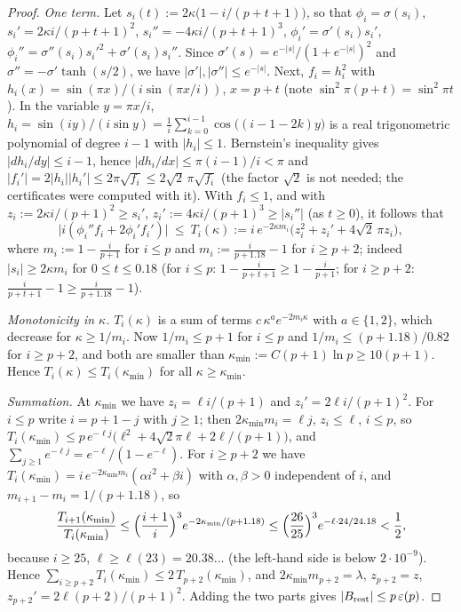 \begin{proof}
\emph{One term.} Let $s_i(t):=2\kappa\bigl(1-i/(p+t+1)\bigr)$, so that $\phi_i=\sigma(s_i)$, $s_i'=2\kappa i/(p+t+1)^2$, $s_i''=-4\kappa i/(p+t+1)^3$, $\phi_i'=\sigma'(s_i)s_i'$, $\phi_i''=\sigma''(s_i)s_i'^2+\sigma'(s_i)s_i''$. Since $\sigma'(s)=e^{-|s|}/(1+e^{-|s|})^2$ and $\sigma''=-\sigma'\tanh(s/2)$, we have $|\sigma'|,|\sigma''|\le e^{-|s|}$. Next, $f_i=h_i^2$ with $h_i(x)=\sin(\pi x)/(i\sin(\pi x/i))$, $x=p+t$ (note $\sin^2\pi(p+t)=\sin^2\pi t$). In the variable $y=\pi x/i$, $h_i=\sin(iy)/(i\sin y)=\tfrac1i\sum_{k=0}^{i-1}\cos\bigl((i-1-2k)y\bigr)$ is a real trigonometric polynomial of degree $i-1$ with $|h_i|\le1$. Bernstein's inequality gives $|dh_i/dy|\le i-1$, hence $|dh_i/dx|\le\pi(i-1)/i<\pi$ and $|f_i'|=2|h_i||h_i'|\le2\pi\sqrt{f_i}\le2\sqrt2\,\pi\sqrt{f_i}$ (the factor $\sqrt2$ is not needed; the certificates were computed with it). With $f_i\le1$, and with $z_i:=2\kappa i/(p+1)^2\ge s_i'$, $z_i':=4\kappa i/(p+1)^3\ge|s_i''|$ (as $t\ge0$), it follows that
\[
\bigl|i(\phi_i''f_i+2\phi_i'f_i')\bigr|\ \le\ T_i(\kappa):=i\,e^{-2\kappa m_i}\bigl(z_i^2+z_i'+4\sqrt2\,\pi z_i\bigr),
\]
where $m_i:=1-\tfrac i{p+1}$ for $i\le p$ and $m_i:=\tfrac i{p+1.18}-1$ for $i\ge p+2$; indeed $|s_i|\ge2\kappa m_i$ for $0\le t\le0.18$ (for $i\le p$: $1-\tfrac i{p+t+1}\ge1-\tfrac i{p+1}$; for $i\ge p+2$: $\tfrac i{p+t+1}-1\ge\tfrac i{p+1.18}-1$).

\emph{Monotonicity in $\kappa$.} $T_i(\kappa)$ is a sum of terms $c\,\kappa^ae^{-2m_i\kappa}$ with $a\in\{1,2\}$, which decrease for $\kappa\ge1/m_i$. Now $1/m_i\le p+1$ for $i\le p$ and $1/m_i\le(p+1.18)/0.82$ for $i\ge p+2$, and both are smaller than $\kappa_{\min}:=C(p+1)\ln p\ge10(p+1)$. Hence $T_i(\kappa)\le T_i(\kappa_{\min})$ for all $\kappa\ge\kappa_{\min}$.

\emph{Summation.} At $\kappa_{\min}$ we have $z_i=\ell i/(p+1)$ and $z_i'=2\ell i/(p+1)^2$. For $i\le p$ write $i=p+1-j$ with $j\ge1$; then $2\kappa_{\min}m_i=\ell j$, $z_i\le\ell$, $i\le p$, so $T_i(\kappa_{\min})\le p\,e^{-\ell j}\bigl(\ell^2+4\sqrt2\pi\ell+2\ell/(p+1)\bigr)$, and $\sum_{j\ge1}e^{-\ell j}=e^{-\ell}/(1-e^{-\ell})$. For $i\ge p+2$ we have $T_i(\kappa_{\min})=i\,e^{-2\kappa_{\min}m_i}(\alpha i^2+\beta i)$ with $\alpha,\beta>0$ independent of $i$, and $m_{i+1}-m_i=1/(p+1.18)$, so
\[
\frac{T_{i+1}(\kappa_{\min})}{T_i(\kappa_{\min})}\le\Bigl(\frac{i+1}i\Bigr)^3e^{-2\kappa_{\min}/(p+1.18)}\le\Bigl(\frac{26}{25}\Bigr)^3e^{-\ell\cdot24/24.18}<\frac12,
\]
because $i\ge25$, $\ell\ge\ell(23)=20.38\ldots$ (the left-hand side is below $2\cdot10^{-9}$). Hence $\sum_{i\ge p+2}T_i(\kappa_{\min})\le2\,T_{p+2}(\kappa_{\min})$, and $2\kappa_{\min}m_{p+2}=\lambda$, $z_{p+2}=z$, $z_{p+2}'=2\ell(p+2)/(p+1)^2$. Adding the two parts gives $|B_{\rm rest}|\le p\,\varepsilon(p)$.


\end{proof}
